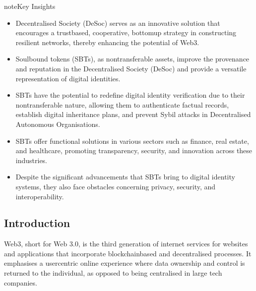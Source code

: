 \documentclass[letterpaper,10pt,english]{jupyterBook}
\begin{document}
\begin{sphinxadmonition}{note}{Key Insights}
\begin{itemize}
\item {} 
\sphinxAtStartPar
Decentralised Society (DeSoc) serves as an innovative solution that encourages a trust\sphinxhyphen{}based, cooperative, bottom\sphinxhyphen{}up strategy in constructing resilient networks, thereby enhancing the potential of Web3.

\item {} 
\sphinxAtStartPar
Soulbound tokens (SBTs), as non\sphinxhyphen{}transferable assets, improve the provenance and reputation in the Decentralised Society (DeSoc) and provide a versatile representation of digital identities.

\item {} 
\sphinxAtStartPar
SBTs have the potential to redefine digital identity verification due to their non\sphinxhyphen{}transferable nature, allowing them to authenticate factual records, establish digital inheritance plans, and prevent Sybil attacks in Decentralised Autonomous Organisations.

\item {} 
\sphinxAtStartPar
SBTs offer functional solutions in various sectors such as finance, real estate, and healthcare, promoting transparency, security, and innovation across these industries.

\item {} 
\sphinxAtStartPar
Despite the significant advancements that SBTs bring to digital identity systems, they also face obstacles concerning privacy, security, and interoperability.

\end{itemize}
\end{sphinxadmonition}


\subsection{Introduction}
\label{\detokenize{SBT/SBT:introduction}}
\begin{sphinxShadowBox}

\sphinxAtStartPar
Web3, short for Web 3.0, is the third generation of internet services for websites and applications that incorporate blockchain\sphinxhyphen{}based and decentralised processes. It emphasises a user\sphinxhyphen{}centric online experience where data ownership and control is returned to the individual, as opposed to being centralised in large tech companies.
\end{sphinxShadowBox}
\end{document}
